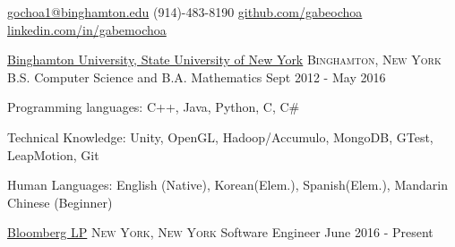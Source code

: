 \documentclass[11pt]{article}
\begin{document}


\nobreakvspace{0.3em}  %

\href{mailto:gochoa1@binghamton.edu}{gochoa1@binghamton.edu}\sbull
(914)-483-8190\sbull
\href{https://github.com/gabeochoa}{github.com/gabeochoa}\sbull
\href{https://www.linkedin.com/in/gabemochoa}{linkedin.com/in/gabemochoa}


\spacedhrule{0.1em}{0.5em}  %

\headedsection
{\href{http://www.binghamton.edu/index.php}{Binghamton University, State University of New York}}
{\textsc{Binghamton, New York}} {
    \inlineheadsection
    {B.S. Computer Science and B.A. Mathematics}
    {Sept 2012 - May 2016}
}


\spacedhrule{0.1em}{0.5em}  %

\inlineheadsection  %
{Programming languages:}
{ C++, Java,  Python, C, C\# }

\inlineheadsection
{Technical Knowledge:}
{ Unity, OpenGL, Hadoop/Accumulo, MongoDB, GTest, LeapMotion, Git }

\inlineheadsection
{Human Languages:}
{English (Native), Korean(Elem.), Spanish(Elem.), Mandarin Chinese (Beginner)}


\spacedhrule{0.1em}{0.5em}  %

\headedsection  %
{\href{http://www.bloomberg.com/}{Bloomberg LP}}
{\textsc{New York, New York}} {
    \headedsubsection
    {Software Engineer}
    {June 2016 - Present}
    {
    }
}
\end{document}
